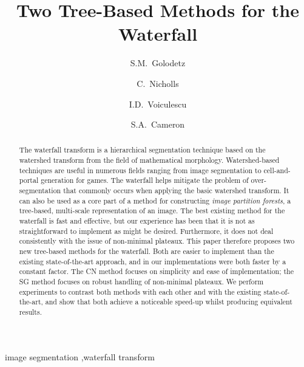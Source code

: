 \documentclass[preprint,a4paper]{elsarticle}
\begin{document}
\begin{frontmatter}

\title{Two Tree-Based Methods for the Waterfall}

\author[ox]{S.M.~Golodetz}

\author[ox]{C.~Nicholls}

\author[ox]{I.D.~Voiculescu}

\author[ox]{S.A.~Cameron}


\address[ox]{Department of Computer Science, University of Oxford, Wolfson Building, Parks Road, Oxford, OX1 3QD, United Kingdom}

\begin{abstract}
The waterfall transform is a hierarchical segmentation technique based on the watershed transform from the field of mathematical morphology. Watershed-based techniques are useful in numerous fields ranging from image segmentation to cell-and-portal generation for games. The waterfall helps mitigate the problem of over-segmentation that commonly occurs when applying the basic watershed transform. It can also be used as a core part of a method for constructing \emph{image partition forests}, a tree-based, multi-scale representation of an image. The best existing method for the waterfall is fast and effective, but our experience has been that it is not as straightforward to implement as might be desired. Furthermore, it does not deal consistently with the issue of non-minimal plateaux. This paper therefore proposes two new tree-based methods for the waterfall. Both are easier to implement than the existing state-of-the-art approach, and in our implementations were both faster by a constant factor. The CN method focuses on simplicity and ease of implementation; the SG method focuses on robust handling of non-minimal plateaux. We perform experiments to contrast both methods with each other and with the existing state-of-the-art, and show that both achieve a noticeable speed-up whilst producing equivalent results.
\end{abstract}

\begin{keyword}
image segmentation \sep waterfall transform
\end{keyword}

\end{frontmatter}
\end{document}
